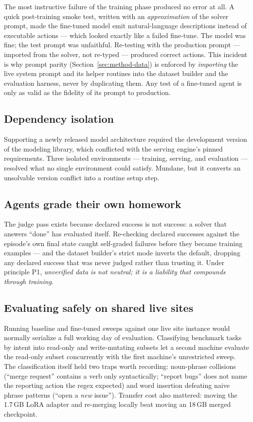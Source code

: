The most instructive failure of the training phase produced no error at all.
A quick post-training smoke test, written with an \emph{approximation} of the
solver prompt, made the fine-tuned model emit natural-language descriptions
instead of executable actions --- which looked exactly like a failed
fine-tune. The model was fine; the test prompt was unfaithful. Re-testing
with the production prompt --- imported from the solver, not re-typed ---
produced correct actions. This incident is why prompt parity
(Section~\ref{sec:method-data}) is enforced by \emph{importing} the live
system prompt and its helper routines into the dataset builder and the
evaluation harness, never by duplicating them. Any test of a fine-tuned
agent is only as valid as the fidelity of its prompt to production.

\subsection{Dependency isolation}

Supporting a newly released model architecture required the development
version of the modeling library, which conflicted with the serving engine's
pinned requirements. Three isolated environments --- training, serving, and
evaluation --- resolved what no single environment could satisfy. Mundane,
but it converts an unsolvable version conflict into a routine setup step.

\subsection{Agents grade their own homework}

The judge pass exists because declared success is not success: a solver that
answers ``done'' has evaluated itself. Re-checking declared successes against
the episode's own final state caught self-graded failures before they became
training examples --- and the dataset builder's strict mode inverts the
default, dropping any declared success that was never judged rather than
trusting it. Under principle P1, \emph{unverified data is not neutral; it is
a liability that compounds through training}.

\subsection{Evaluating safely on shared live sites}

Running baseline and fine-tuned sweeps against one live site instance would
normally serialize a full working day of evaluation. Classifying benchmark
tasks by intent into read-only and write-mutating subsets let a second
machine evaluate the read-only subset concurrently with the first machine's
unrestricted sweep. The classification itself held two traps worth recording:
noun-phrase collisions (``merge request'' contains a verb only
syntactically; ``report bugs'' does not name the reporting action the regex
expected) and word insertion defeating naive phrase patterns (``open a
\emph{new} issue''). Transfer cost also mattered: moving the 1.7\,GB LoRA
adapter and re-merging locally beat moving an 18\,GB merged checkpoint.

